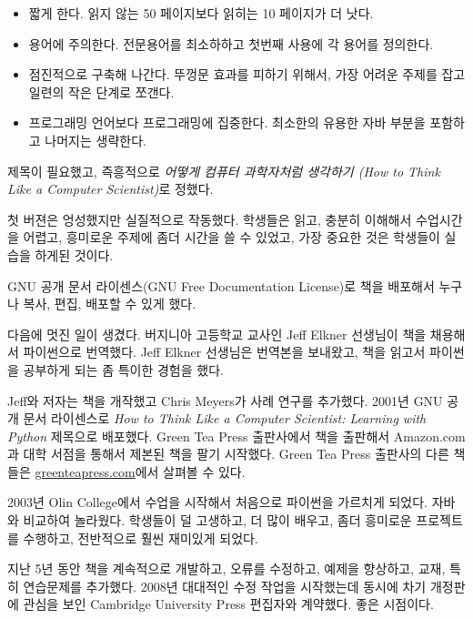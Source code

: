 \begin{itemize}

\item 짧게 한다. 읽지 않는 50 페이지보다 읽히는 10 페이지가 더 낫다.

\item 용어에 주의한다. 전문용어를 최소하하고 첫번째 사용에 각 용어를 정의한다.

\item 점진적으로 구축해 나간다. 뚜껑문 효과를 피하기 위해서, 가장 어려운 주제를 잡고 일련의 작은 단계로 쪼갠다.

\item 프로그래밍 언어보다 프로그래밍에 집중한다. 최소한의 유용한 자바 부분을 포함하고 나머지는 생략한다.

\end{itemize}

제목이 필요했고, 즉흥적으로 \emph{어떻게 컴퓨터 과학자처럼 생각하기 (How to Think Like a Computer Scientist)}로 정했다.

첫 버젼은 엉성했지만 실질적으로 작동했다. 학생들은 읽고, 충분히 이해해서 수업시간을 어렵고, 흥미로운 주제에 좀더 시간을 쓸 수 있었고,
가장 중요한 것은 학생들이 실습을 하게된 것이다.

GNU 공개 문서 라이센스(GNU Free Documentation License)로 책을 배포해서 누구나 복사, 편집, 배포할 수 있게 했다.


다음에 멋진 일이 생겼다. 버지니아 고등학교 교사인 Jeff Elkner 선생님이 책을 채용해서 파이썬으로 번역했다.
Jeff Elkner 선생님은 번역본을 보내왔고, 책을 읽고서 파이썬을 공부하게 되는 좀 특이한 경험을 했다.

Jeff와 저자는 책을 개작했고 Chris Meyers가 사례 연구를 추가했다. 2001년 GNU 공개 문서 라이센스로 
\emph{How to Think Like a Computer Scientist: Learning with Python} 제목으로 배포했다.
Green Tea Press 출판사에서 책을 출판해서 Amazon.com과 대학 서점을 통해서 제본된 책을 팔기 시작했다.
Green Tea Press 출판사의 다른 책들은 \url{greenteapress.com}에서 살펴볼 수 있다.

2003년 Olin College에서 수업을 시작해서 처음으로 파이썬을 가르치게 되었다.
자바와 비교하여 놀라웠다. 학생들이 덜 고생하고, 더 많이 배우고, 좀더 흥미로운 프로젝트를 수행하고, 전반적으로 훨씬 재미있게 되었다.

지난 5년 동안 책을 계속적으로 개발하고, 오류를 수정하고, 예제을 향상하고, 교재, 특히 연습문제를 추가했다.
2008년 대대적인 수정 작업을 시작했는데 동시에 차기 개정판에 관심을 보인 Cambridge University Press 편집자와 계약했다. 좋은 시점이다.

